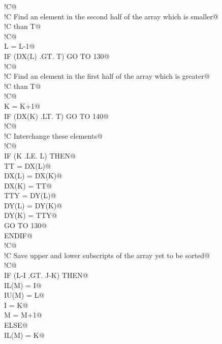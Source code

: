 \documentclass[10pt,a4paper,notitlepage]{article}
\begin{document}
\begin{flushleft}
\begin{list}{}{}
\mbox{}\verb@!C@\\
\mbox{}\verb@!C     Find an element in the second half of the array which is smaller@\\
\mbox{}\verb@!C     than T@\\
\mbox{}\verb@!C@\\
\mbox{} L = L-1@\\
\mbox{}\verb@      IF (DX(L) .GT. T) GO TO 130@\\
\mbox{}\verb@!C@\\
\mbox{}\verb@!C     Find an element in the first half of the array which is greater@\\
\mbox{}\verb@!C     than T@\\
\mbox{}\verb@!C@\\
\mbox{} K = K+1@\\
\mbox{}\verb@      IF (DX(K) .LT. T) GO TO 140@\\
\mbox{}\verb@!C@\\
\mbox{}\verb@!C     Interchange these elements@\\
\mbox{}\verb@!C@\\
\mbox{}\verb@      IF (K .LE. L) THEN@\\
\mbox{}\verb@         TT = DX(L)@\\
\mbox{}\verb@         DX(L) = DX(K)@\\
\mbox{}\verb@         DX(K) = TT@\\
\mbox{}\verb@         TTY = DY(L)@\\
\mbox{}\verb@         DY(L) = DY(K)@\\
\mbox{}\verb@         DY(K) = TTY@\\
\mbox{}\verb@         GO TO 130@\\
\mbox{}\verb@      ENDIF@\\
\mbox{}\verb@!C@\\
\mbox{}\verb@!C     Save upper and lower subscripts of the array yet to be sorted@\\
\mbox{}\verb@!C@\\
\mbox{}\verb@      IF (L-I .GT. J-K) THEN@\\
\mbox{}\verb@         IL(M) = I@\\
\mbox{}\verb@         IU(M) = L@\\
\mbox{}\verb@         I = K@\\
\mbox{}\verb@         M = M+1@\\
\mbox{}\verb@      ELSE@\\
\mbox{}\verb@         IL(M) = K@\\

\end{list}
\end{flushleft}
\end{document}
